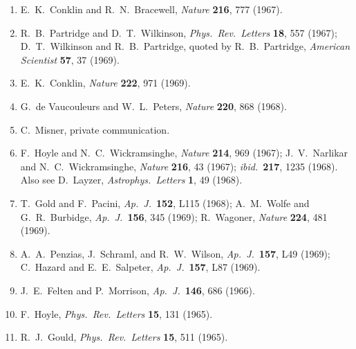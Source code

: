 \begin{enumerate}
  \item{}\label{ch15-ref-70}
  E.~K.~Conklin and R.~N.~Bracewell,
  \emph{Nature} \textbf{216}, 777 (1967).

  \item{}\label{ch15-ref-71}
  R.~B.~Partridge and D.~T.~Wilkinson,
  \emph{Phys.\ Rev.\ Letters} \textbf{18}, 557 (1967);
  D.~T.~Wilkinson and R.~B.~Partridge, quoted by R.~B.~Partridge,
  \emph{American Scientist} \textbf{57}, 37 (1969).

  \item{}\label{ch15-ref-72}
  E.~K.~Conklin, \emph{Nature} \textbf{222}, 971 (1969).

  \item{}\label{ch15-ref-73}
  G.~de Vaucouleurs and W.~L.~Peters,
  \emph{Nature} \textbf{220}, 868 (1968).

  \item{}\label{ch15-ref-74}
  C.~Misner, private communication.

  \item{}\label{ch15-ref-75}
  F.~Hoyle and N.~C.~Wickramsinghe,
  \emph{Nature} \textbf{214}, 969 (1967);
  J.~V.~Narlikar and N.~C.~Wickramsinghe,
  \emph{Nature} \textbf{216}, 43 (1967);
  \emph{ibid.}\ \textbf{217}, 1235 (1968).
  Also see D.~Layzer, \emph{Astrophys.\ Letters} \textbf{1}, 49 (1968).

  \item{}\label{ch15-ref-76}
  T.~Gold and F.~Pacini, \emph{Ap.\ J.}\ \textbf{152}, L115 (1968);
  A.~M.~Wolfe and G.~R.~Burbidge,
  \emph{Ap.\ J.}\ \textbf{156}, 345 (1969);
  R.~Wagoner, \emph{Nature} \textbf{224}, 481 (1969).

  \item{}\label{ch15-ref-77}
  A.~A.~Penzias, J.~Schraml, and R.~W.~Wilson,
  \emph{Ap.\ J.}\ \textbf{157}, L49 (1969);
  C.~Hazard and E.~E.~Salpeter,
  \emph{Ap.\ J.}\ \textbf{157}, L87 (1969).

  \item{}\label{ch15-ref-78}
  J.~E.~Felten and P.~Morrison,
  \emph{Ap.\ J.}\ \textbf{146}, 686 (1966).

  \item{}\label{ch15-ref-79}
  F.~Hoyle, \emph{Phys.\ Rev.\ Letters} \textbf{15}, 131 (1965).

  \item{}\label{ch15-ref-80}
  R.~J.~Gould, \emph{Phys.\ Rev.\ Letters} \textbf{15}, 511 (1965).


\end{enumerate}
